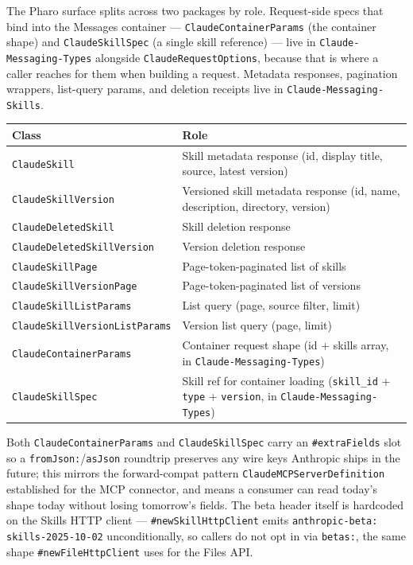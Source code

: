 \documentclass[a4paper,10pt,fleqn]{article}
\newcommand{\cls}[1]{\texttt{#1}}
\newcommand{\sel}[1]{\texttt{\##1}}
\newcommand{\pkg}[1]{\texttt{#1}}
\begin{document}
The Pharo surface splits across two packages by role.
Request-side specs that bind into the Messages container ---
\cls{ClaudeContainerParams} (the container shape) and
\cls{ClaudeSkillSpec} (a single skill reference) --- live in
\pkg{Claude-Messaging-Types} alongside \cls{ClaudeRequestOptions},
because that is where a caller reaches for them when building a
request.  Metadata responses, pagination wrappers, list-query
params, and deletion receipts live in
\pkg{Claude-Messaging-Skills}.

\begin{center}
\begin{tabular}{@{}lp{6.5cm}@{}}
\toprule
\textbf{Class} & \textbf{Role} \\
\midrule
\cls{ClaudeSkill} & Skill metadata response (id, display title,
  source, latest version) \\
\cls{ClaudeSkillVersion} & Versioned skill metadata response (id,
  name, description, directory, version) \\
\cls{ClaudeDeletedSkill} & Skill deletion response \\
\cls{ClaudeDeletedSkillVersion} & Version deletion response \\
\cls{ClaudeSkillPage} & Page-token-paginated list of skills \\
\cls{ClaudeSkillVersionPage} & Page-token-paginated list of versions \\
\cls{ClaudeSkillListParams} & List query (page, source filter, limit) \\
\cls{ClaudeSkillVersionListParams} & Version list query (page, limit) \\
\cls{ClaudeContainerParams} & Container request shape (id + skills
  array, in \pkg{Claude-Messaging-Types}) \\
\cls{ClaudeSkillSpec} & Skill ref for container loading
  (\texttt{skill\_id} + \texttt{type} + \texttt{version}, in
  \pkg{Claude-Messaging-Types}) \\
\bottomrule
\end{tabular}
\end{center}

\begin{sloppypar}
Both \cls{ClaudeContainerParams} and \cls{ClaudeSkillSpec} carry an
\sel{extraFields} slot so a \texttt{fromJson:}/\texttt{asJson}
roundtrip preserves any wire keys Anthropic ships in the future;
this mirrors the forward-compat pattern \cls{ClaudeMCPServerDefinition}
established for the MCP connector, and means a consumer can read
today's shape today without losing tomorrow's fields.  The beta
header itself is hardcoded on the Skills HTTP client ---
\sel{newSkillHttpClient} emits \texttt{anthropic-beta:
skills-2025-10-02} unconditionally, so callers do not opt in via
\texttt{betas:}, the same shape \sel{newFileHttpClient} uses for
the Files API.
\end{sloppypar}
\end{document}
